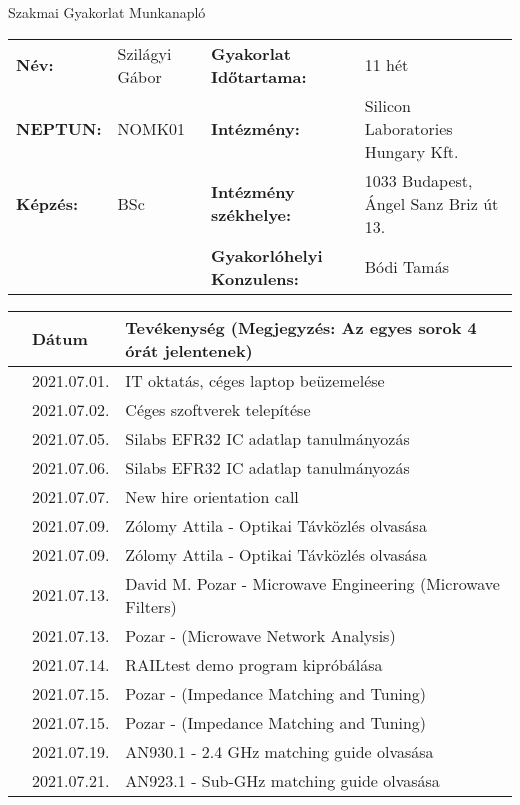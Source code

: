 \documentclass[10pt,a4paper,oneside]{report}
\newcounter{magicrownumbers}
\newcommand\rownum{\stepcounter{magicrownumbers}\arabic{magicrownumbers}}
\begin{document}
\begin{center}
	\Large{Szakmai Gyakorlat Munkanapló}
\end{center}
\begin{tabular}{p{2.5 cm} p{2.5 cm} p{5 cm} p{6 cm}}
	\textbf{Név:} & Szilágyi Gábor & \textbf{Gyakorlat Időtartama:} & 11 hét\\
	\textbf{NEPTUN:} & NOMK01 & \textbf{Intézmény:} & Silicon Laboratories Hungary Kft.\\
	\textbf{Képzés:} & BSc & \textbf{Intézmény székhelye:} & 1033 Budapest, Ángel Sanz Briz út 13. \\
	& & \textbf{Gyakorlóhelyi Konzulens:} & Bódi Tamás
\end{tabular}
\begin{table}[h!]
	\centering
	\small
	\begin{tabular}{| c | p{3 cm} | p{10 cm} |}
	\hline
	 & Dátum & Tevékenység (Megjegyzés: Az egyes sorok 4 órát jelentenek) \\ \hline \hline
	\rownum & 2021.07.01. & IT oktatás, céges laptop beüzemelése \\ \hline
	\rownum & 2021.07.02. & Céges szoftverek telepítése \\ \hline
	\rownum & 2021.07.05. & Silabs EFR32 IC adatlap tanulmányozás \\ \hline
	\rownum & 2021.07.06. & Silabs EFR32 IC adatlap tanulmányozás \\ \hline
	\rownum & 2021.07.07. & New hire orientation call \\ \hline
	\rownum & 2021.07.09. & Zólomy Attila - Optikai Távközlés olvasása \\ \hline
	\rownum & 2021.07.09. & Zólomy Attila - Optikai Távközlés olvasása \\ \hline
	\rownum & 2021.07.13. & David M. Pozar - Microwave Engineering (Microwave Filters) \\ \hline
	\rownum & 2021.07.13. & Pozar - (Microwave Network Analysis) \\ \hline
	\rownum & 2021.07.14. & RAILtest demo program kipróbálása \\ \hline
	\rownum & 2021.07.15. & Pozar - (Impedance Matching and Tuning) \\ \hline
	\rownum & 2021.07.15. & Pozar - (Impedance Matching and Tuning) \\ \hline
	\rownum & 2021.07.19. & AN930.1 - 2.4 GHz matching guide olvasása \\ \hline
	\rownum & 2021.07.21. & AN923.1 - Sub-GHz matching guide olvasása \\ \hline

\end{tabular}
\end{table}
\end{document}
